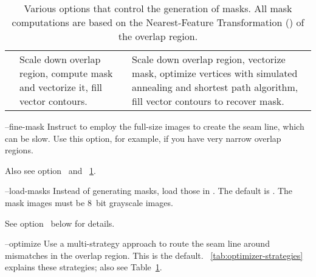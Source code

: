 \begin{codelist}
\begin{table}
\begin{tabular}{lp{.3\linewidth}p{.4\linewidth}}
      \option{--coarse-mask} & Scale down overlap region, compute \acronym{NFT} mask and
      vectorize it, fill vector contours. & Scale down overlap region, vectorize \acronym{NFT}
      mask, optimize vertices with simulated annealing and \propername{Dijkstra's} shortest path
      algorithm, fill vector contours to recover mask.
    \end{tabular}

    \caption[Mask generation options]{\label{tab:mask-generation}%
      Various options that control the generation of masks.  All mask computations are based on
      the Nearest-Feature Transformation () of the overlap region.}
  \end{table}


  \label{opt:fine-mask}%
\item[--fine-mask]\itemend
  Instruct \App{} to employ the full-size images to create the seam line, which can be slow.
  Use this option, for example, if you have very narrow overlap regions.

  Also see option~ and \tableName~\ref{tab:mask-generation}.


  \label{opt:load-masks}%
\item[--load-masks\optional{=\metavar{IMAGE-TEMPLATE}}]\itemend
  Instead of generating masks, load those in .  The default is
  \mbox{}.  The mask images must be 8~bit grayscale
  images.

  See option~ below for details.


  \label{opt:optimize}%
\item[--optimize]\itemend
  Use a multi-strategy approach to route the seam line around mismatches in the overlap region.
  This is the default.  \tableName~\ref{tab:optimizer-strategies} explains these strategies;
  also see Table~\ref{tab:mask-generation}.


\end{codelist}
